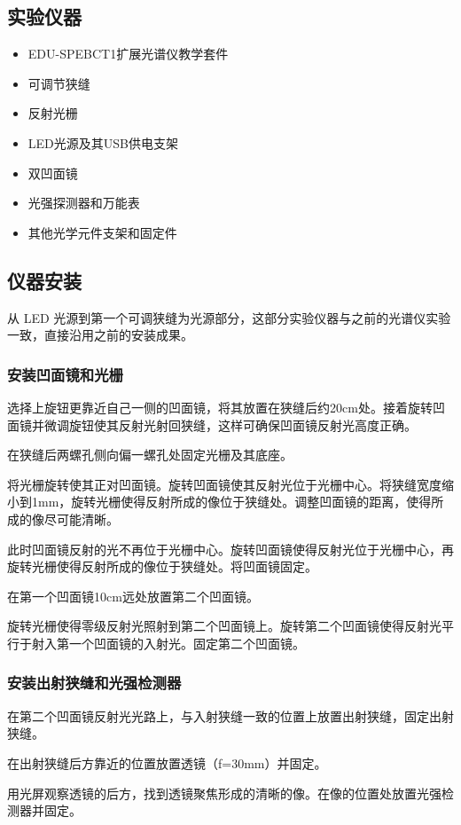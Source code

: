 \documentclass{ctexart}
\begin{document}
\subsection{实验仪器}
\begin{itemize}
    \item EDU-SPEBCT1扩展光谱仪教学套件
    \item 可调节狭缝
    \item 反射光栅
    \item LED光源及其USB供电支架
    \item 双凹面镜
    \item 光强探测器和万能表
    \item 其他光学元件支架和固定件
\end{itemize}
\subsection{仪器安装}
从 LED 光源到第一个可调狭缝为光源部分，这部分实验仪器与之前的光谱仪实验一致，直接沿用之前的安装成果。

\subsubsection{安装凹面镜和光栅}
选择上旋钮更靠近自己一侧的凹面镜，将其放置在狭缝后约20cm处。接着旋转凹面镜并微调旋钮使其反射光射回狭缝，这样可确保凹面镜反射光高度正确。

在狭缝后两螺孔侧向偏一螺孔处固定光栅及其底座。

将光栅旋转使其正对凹面镜。旋转凹面镜使其反射光位于光栅中心。将狭缝宽度缩小到1mm，旋转光栅使得反射所成的像位于狭缝处。调整凹面镜的距离，使得所成的像尽可能清晰。

此时凹面镜反射的光不再位于光栅中心。旋转凹面镜使得反射光位于光栅中心，再旋转光栅使得反射所成的像位于狭缝处。将凹面镜固定。

在第一个凹面镜10cm远处放置第二个凹面镜。

旋转光栅使得零级反射光照射到第二个凹面镜上。旋转第二个凹面镜使得反射光平行于射入第一个凹面镜的入射光。固定第二个凹面镜。

\subsubsection{安装出射狭缝和光强检测器}
在第二个凹面镜反射光光路上，与入射狭缝一致的位置上放置出射狭缝，固定出射狭缝。

在出射狭缝后方靠近的位置放置透镜（f=30mm）并固定。

用光屏观察透镜的后方，找到透镜聚焦形成的清晰的像。在像的位置处放置光强检测器并固定。
\end{document}
